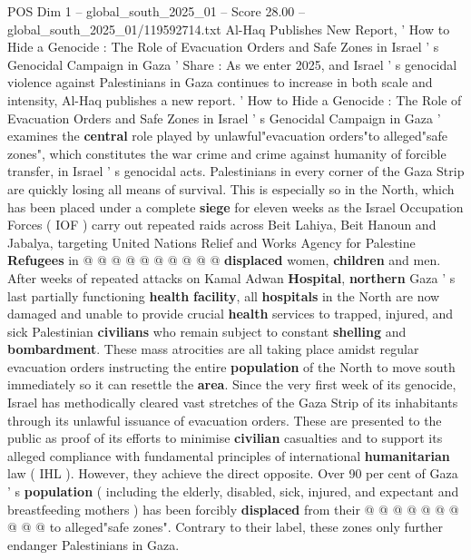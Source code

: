 \begin{textsample}{POS Dim 1 – global\_south\_2025\_01 – Score 28.00 – global\_south\_2025\_01/119592714.txt}  \label{ex:f1_pos_295}
Al-Haq Publishes New Report, ' How to Hide a Genocide : The Role of Evacuation Orders and Safe Zones in Israel ' s Genocidal Campaign in Gaza ' Share : As we enter 2025, and Israel ' s genocidal violence against Palestinians in Gaza continues to increase in both scale and intensity, Al-Haq publishes a new report. ' How to Hide a Genocide : The Role of Evacuation Orders and Safe Zones in Israel ' s Genocidal Campaign in Gaza ' examines the \textbf{central} role played by unlawful"evacuation orders"to alleged"safe zones", which constitutes the war crime and crime against humanity of forcible transfer, in Israel ' s genocidal acts.
Palestinians in every corner of the Gaza Strip are quickly losing all means of survival.
This is especially so in the North, which has been placed under a complete \textbf{siege} for eleven weeks as the Israel Occupation Forces ( IOF ) carry out repeated raids across Beit Lahiya, Beit Hanoun and Jabalya, targeting United Nations Relief and Works Agency for Palestine \textbf{Refugees} in @ @ @ @ @ @ @ @ @ @ \textbf{displaced} women, \textbf{children} and men.
After weeks of repeated attacks on Kamal Adwan \textbf{Hospital}, \textbf{northern} Gaza ' s last partially functioning \textbf{health} \textbf{facility}, all \textbf{hospitals} in the North are now damaged and unable to provide crucial \textbf{health} services to trapped, injured, and sick Palestinian \textbf{civilians} who remain subject to constant \textbf{shelling} and \textbf{bombardment}.
These mass atrocities are all taking place amidst regular evacuation orders instructing the entire \textbf{population} of the North to move south immediately so it can resettle the \textbf{area}.
Since the very first week of its genocide, Israel has methodically cleared vast stretches of the Gaza Strip of its inhabitants through its unlawful issuance of evacuation orders.
These are presented to the public as proof of its efforts to minimise \textbf{civilian} casualties and to support its alleged compliance with fundamental principles of international \textbf{humanitarian} law ( IHL ).
However, they achieve the direct opposite.
Over 90 per cent of Gaza ' s \textbf{population} ( including the elderly, disabled, sick, injured, and expectant and breastfeeding mothers ) has been forcibly \textbf{displaced} from their @ @ @ @ @ @ @ @ @ @ to alleged"safe zones".
Contrary to their label, these zones only further endanger Palestinians in Gaza.

\end{textsample}
